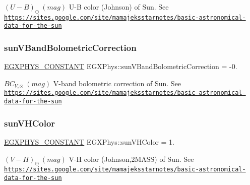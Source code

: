 $ (U-B)_{\odot} \ (mag)$ U-\/B color (Johnson) of Sun. See \href{https://sites.google.com/site/mamajeksstarnotes/basic-astronomical-data-for-the-sun}{\tt https\+://sites.\+google.\+com/site/mamajeksstarnotes/basic-\/astronomical-\/data-\/for-\/the-\/sun} \mbox{\label{group___e_g_x_phys-_constants-_astrophysics-_solar_system-_sun-_magnitude_gaa7571d96b3287465aa072d58ac6fc4e2}} 
\subsubsection{\texorpdfstring{sun\+V\+Band\+Bolometric\+Correction}{sunVBandBolometricCorrection}}
{\footnotesize\ttfamily \mbox{\hyperlink{group___e_g_x_phys-_constants-_macros_ga76980d288494ce1714c9ac68a95ba702}{E\+G\+X\+P\+H\+Y\+S\+\_\+\+C\+O\+N\+S\+T\+A\+NT}} E\+G\+X\+Phys\+::sun\+V\+Band\+Bolometric\+Correction = -\/0.}

$ BC_{V,\odot} \ (mag)$ V-\/band bolometric correction of Sun. See \href{https://sites.google.com/site/mamajeksstarnotes/basic-astronomical-data-for-the-sun}{\tt https\+://sites.\+google.\+com/site/mamajeksstarnotes/basic-\/astronomical-\/data-\/for-\/the-\/sun} \mbox{\label{group___e_g_x_phys-_constants-_astrophysics-_solar_system-_sun-_magnitude_ga4eb2e68e46cc2bf0ca16133656e982f1}} 
\subsubsection{\texorpdfstring{sun\+V\+H\+Color}{sunVHColor}}
{\footnotesize\ttfamily \mbox{\hyperlink{group___e_g_x_phys-_constants-_macros_ga76980d288494ce1714c9ac68a95ba702}{E\+G\+X\+P\+H\+Y\+S\+\_\+\+C\+O\+N\+S\+T\+A\+NT}} E\+G\+X\+Phys\+::sun\+V\+H\+Color = 1.}

$ (V-H)_{\odot} \ (mag)$ V-\/H color (Johnson,2\+M\+A\+SS) of Sun. See \href{https://sites.google.com/site/mamajeksstarnotes/basic-astronomical-data-for-the-sun}{\tt https\+://sites.\+google.\+com/site/mamajeksstarnotes/basic-\/astronomical-\/data-\/for-\/the-\/sun} \mbox{\label{group___e_g_x_phys-_constants-_astrophysics-_solar_system-_sun-_magnitude_gae62acc2450ab3c4b509ebf2b2896b4c2}} 
